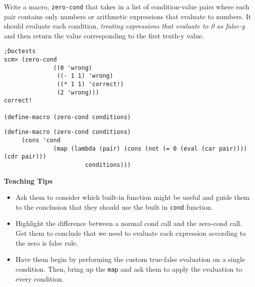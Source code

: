 \question Write a macro, \texttt{zero-cond} that takes in a list of condition-value pairs where each pair contains only numbers or arithmetic expressions that evaluate to numbers. It should evaluate each condition, \emph{treating expressions that evaluate to 0 as false-y} and then return the value corresponding to the first truth-y value.

\begin{lstlisting}
;Doctests
scm> (zero-cond
              ((0 'wrong)
               ((- 1 1) 'wrong)
               ((* 1 1) 'correct!)
               (2 'wrong)))
correct!

(define-macro (zero-cond conditions)
\end{lstlisting}
\begin{solution}
\begin{lstlisting}
(define-macro (zero-cond conditions)
     (cons 'cond 
              (map (lambda (pair) (cons (not (= 0 (eval (car pair)))) (cdr pair))) 
                       conditions)))
\end{lstlisting}
\end{solution}

\begin{blocksection}
\begin{guide}
\textbf{Teaching Tips}
\begin{itemize}
	\item Ask them to consider which built-in function might be useful and guide them to the conclusion that they should use the built in \lstinline{cond} function.
	\item Highlight the difference between a normal cond call and the zero-cond call. Get them to conclude that we need to evaluate each expression according to the zero is false rule.
	\item Have them begin by performing the custom true-false evaluation on a single condition. Then, bring up the 
\lstinline{map} and ask them to apply the evaluation to every condition.
\end{itemize}
\end{guide}
\end{blocksection}